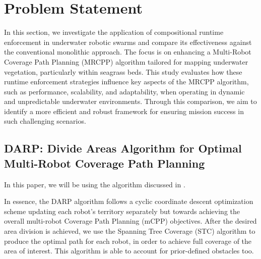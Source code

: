 
\chapter{Problem Statement}
\graphicspath{{Chapter_3/Vector/}{Chapter_3/}}

In this section, we investigate the application of compositional runtime enforcement in underwater robotic swarms and compare its effectiveness against the conventional monolithic approach. The focus is on enhancing a Multi-Robot Coverage Path Planning (MRCPP) algorithm tailored for mapping underwater vegetation, particularly within seagrass beds. This study evaluates how these runtime enforcement strategies influence key aspects of the MRCPP algorithm, such as performance, scalability, and adaptability, when operating in dynamic and unpredictable underwater environments. Through this comparison, we aim to identify a more efficient and robust framework for ensuring mission success in such challenging scenarios.

\section{DARP: Divide Areas Algorithm for Optimal Multi-Robot Coverage Path Planning}
\label{DARP}

In this paper, we will be using the algorithm discussed in \cite{kapoutsisdarp}.

In essence, the DARP algorithm follows a cyclic coordinate descent optimization scheme updating each robot’s territory separately but towards achieving the overall multi-robot Coverage Path Planning (mCPP) objectives. After the desired area division is achieved, we use the Spanning Tree Coverage (STC) algorithm to produce the optimal path for each robot, in order to achieve full coverage of the area of interest. This algorithm is able to account for prior-defined obstacles too.

